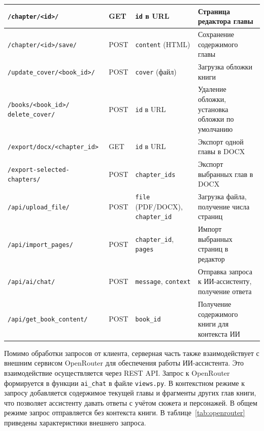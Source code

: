 \begin{xltabular}{\textwidth}{|>{\centering\arraybackslash}p{4.7cm}|>{\centering\arraybackslash}p{1.8cm}|>{\centering\arraybackslash}p{3.1cm}|X|}
    \texttt{/chapter/<id>/} & GET & \texttt{id} в URL & Страница редактора главы \\ \hline
    \texttt{/chapter/<id>/save/} & POST & \texttt{content} (HTML) & Сохранение содержимого главы     \\ \hline
    \texttt{/update\_cover/<book\_id>/} & POST & \texttt{cover} (файл) & Загрузка обложки книги \\ \hline
    \texttt{/books/<book\_id>/ delete\_cover/} & POST & \texttt{id} в URL & Удаление обложки, установка обложки по умолчанию \\ \hline
    \texttt{/export/docx/<chapter\_id>} & GET & \texttt{id} в URL & Экспорт одной главы в DOCX \\ \hline
    \texttt{/export-selected-chapters/} & POST & \texttt{chapter\_ids} & Экспорт выбранных глав в DOCX \\ \hline
    \texttt{/api/upload\_file/} & POST & \texttt{file} (PDF/DOCX), \texttt{chapter\_id} & Загрузка файла, получение числа страниц \\ \hline
    \texttt{/api/import\_pages/} & POST & \texttt{chapter\_id}, \texttt{pages} & Импорт выбранных страниц в редактор \\ \hline
    \texttt{/api/ai/chat/} & POST & \texttt{message}, \texttt{context} & Отправка запроса к ИИ-ассистенту, получение ответа \\ \hline
    \texttt{/api/get\_book\_content/} & POST & \texttt{book\_id} & Получение содержимого книги для контекста ИИ \\ \hline
\end{xltabular}

Помимо обработки запросов от клиента, серверная часть также взаимодействует с внешним сервисом OpenRouter для обеспечения работы ИИ-ассистента. Это взаимодействие осуществляется через REST API. Запрос к OpenRouter формируется в функции \texttt{ai\_chat} в файле \texttt{views.py}. В контекстном режиме к запросу добавляется содержимое текущей главы и фрагменты других глав книги, что позволяет ассистенту давать ответы с учётом сюжета и персонажей. В общем режиме запрос отправляется без контекста книги. В таблице~\ref{tab:openrouter} приведены характеристики внешнего запроса.


